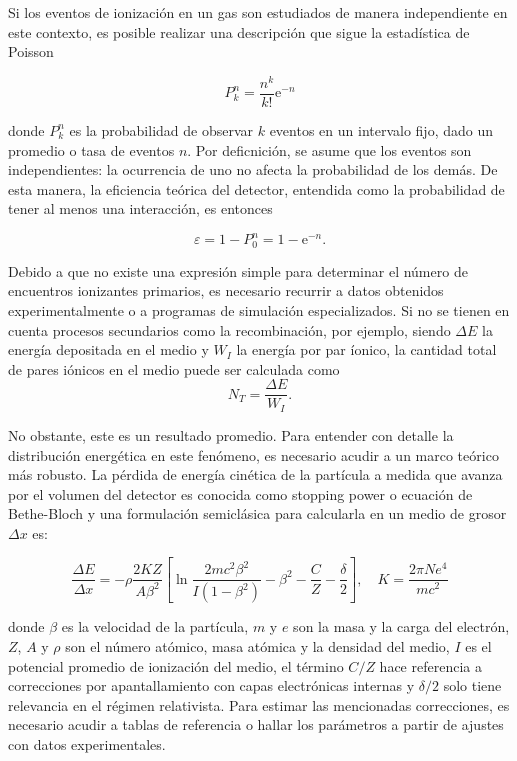 \documentclass{article}
\begin{document}
\noindent Si los eventos de ionización en un gas son estudiados de manera independiente en este contexto, es posible realizar una descripción que sigue la estadística de Poisson

\begin{equation}
    \label{eq:poisson}
    P_k^n=\frac{n^k}{k!} \mathrm{e}^{-n}
\end{equation}

\noindent donde $ P_k^n$ es la probabilidad de observar $k$ eventos en un intervalo fijo, dado un promedio o tasa de eventos $n$. Por deficnición, se asume que los eventos son independientes: la ocurrencia de uno no afecta la probabilidad de los demás. De esta manera, la eficiencia teórica del detector, entendida como la probabilidad de tener al menos una interacción, es entonces

\begin{equation}
    \label{eq:det_eff}
    \varepsilon=1-P_0^n=1-\mathrm{e}^{-n} .
\end{equation}

\noindent Debido a que no existe una expresión simple para determinar el número de encuentros ionizantes primarios, es necesario recurrir a datos obtenidos experimentalmente o a programas de simulación especializados. Si no se tienen en cuenta procesos secundarios como la recombinación, por ejemplo, siendo $\Delta E$ la energía depositada en el medio y $W_{I}$ la energía por par íonico, la cantidad total de pares iónicos en el medio puede ser calculada como 
\begin{equation}
    \label{eq:num_ion}
    N_{T} = \frac{\Delta E}{W_{I}}.
\end{equation}

\noindent No obstante, este es un resultado promedio. Para entender con detalle la distribución energética en este fenómeno, es necesario acudir a un marco teórico más robusto. La pérdida de energía cinética de la partícula a medida que avanza por el volumen del detector es conocida como stopping power o ecuación de Bethe-Bloch y una formulación semiclásica para calcularla en un medio de grosor $\Delta x$ es: 

\begin{equation}
    \label{eq:bethe_bloch}
    \frac{\Delta E}{\Delta x}=-\rho \frac{2 K Z}{A \beta^2}\left[\ln \frac{2 m c^2 \beta^2}{I\left(1-\beta^2\right)}-\beta^2-\frac{C}{Z}-\frac{\delta}{2}\right], \quad K = \frac{2 \pi N e^{4}}{mc^{2}}
    \end{equation}

donde $\beta$ es la velocidad de la partícula, $m$ y $e$ son la masa y la carga del electrón, $Z$, $A$ y $\rho$ son el número atómico, masa atómica y la densidad del medio, $I$ es el potencial promedio de ionización del medio, el término $C/Z$ hace referencia a correcciones por apantallamiento con capas electrónicas internas y $\delta /2$ solo tiene relevancia en el régimen relativista. Para estimar las mencionadas correcciones, es necesario acudir a tablas de referencia o hallar los parámetros a partir de ajustes con datos experimentales.\\ 
\end{document}
